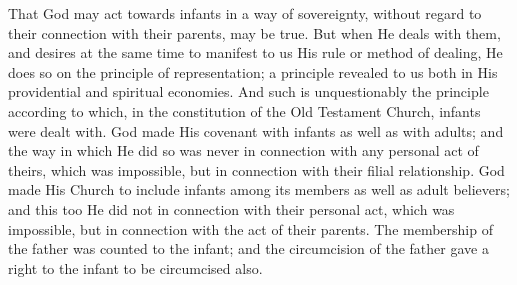 \documentclass[
]{book}
\begin{document}
That God may act towards infants in a way of sovereignty, without regard to their connection with their parents, may be true. But when He deals with them, and desires at the same time to manifest to us His rule or method of dealing, He does so on the principle of representation; a principle revealed to us both in His providential and spiritual economies. And such is unquestionably the principle according to which, in the constitution of the Old Testament Church, infants were dealt with. God made His covenant with infants as well as with adults; and the way in which He did so was never in connection with any personal act of theirs, which was impossible, but in connection with their filial relationship. God made His Church to include infants among its members as well as adult believers; and this too He did not in connection with their personal act, which was impossible, but in connection with the act of their parents. The membership of the father was counted to the infant; and the circumcision of the father gave a right to the infant to be circumcised also.
\end{document}
